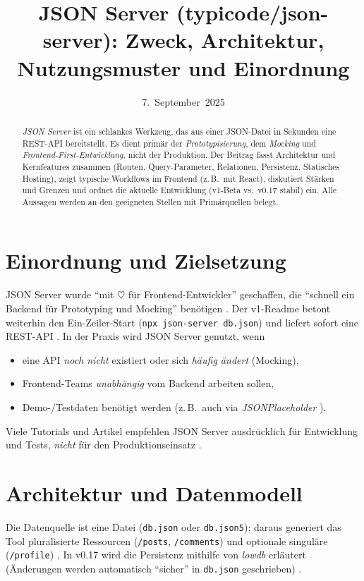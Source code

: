 \documentclass[11pt,a4paper]{article}
\title{JSON Server (typicode/json-server): Zweck, Architektur, Nutzungsmuster und Einordnung}
\author{ }
\date{7.~September~2025}
\begin{document}
\maketitle

\begin{abstract}
\noindent
\emph{JSON Server} ist ein schlankes Werkzeug, das aus einer JSON-Datei in Sekunden eine REST-API bereitstellt. Es dient primär der \emph{Prototypisierung}, dem \emph{Mocking} und \emph{Frontend-First-Entwicklung}, nicht der Produktion. Der Beitrag fasst Architektur und Kernfeatures zusammen (Routen, Query-Parameter, Relationen, Persistenz, Statisches Hosting), zeigt typische Workflows im Frontend (z.\,B.\ mit React), diskutiert Stärken und Grenzen und ordnet die aktuelle Entwicklung (v1-Beta vs.\ v0.17 stabil) ein. Alle Aussagen werden an den geeigneten Stellen mit Primärquellen belegt.
\end{abstract}

\section{Einordnung und Zielsetzung}
\label{sec:einordnung}
JSON Server wurde \enquote{mit $\heartsuit$ für Frontend-Entwickler} geschaffen, die \enquote{schnell ein Backend für Prototyping und Mocking} benötigen \cite[v0-Dokumentation]{jsonserver-github-v0}. Der v1-Readme betont weiterhin den Ein-Zeiler-Start (\texttt{npx json-server db.json}) und liefert sofort eine REST-API \cite[v1-Readme]{jsonserver-github-v1}. In der Praxis wird JSON Server genutzt, wenn
\begin{itemize}
  \item eine API \emph{noch nicht} existiert oder sich \emph{häufig ändert} (Mocking),
  \item Frontend-Teams \emph{unabhängig} vom Backend arbeiten sollen,
  \item Demo-/Testdaten benötigt werden (z.\,B.\ auch via \emph{JSONPlaceholder} \cite{jsonplaceholder}).
\end{itemize}
Viele Tutorials und Artikel empfehlen JSON Server ausdrücklich für Entwicklung und Tests, \emph{nicht} für den Produktionseinsatz \cite{freecodecamp,sitepoint}. 

\section{Architektur und Datenmodell}
\label{sec:architektur}
Die Datenquelle ist eine Datei (\texttt{db.json} oder \texttt{db.json5}); daraus generiert das Tool pluralisierte Ressourcen (\texttt{/posts}, \texttt{/comments}) und optionale singuläre (\texttt{/profile}) \cite[Abschnitt \enquote{Routes}]{jsonserver-github-v1}. In v0.17 wird die Persistenz mithilfe von \emph{lowdb} erläutert (Änderungen werden automatisch \enquote{sicher} in \texttt{db.json} geschrieben) \cite[v0-Persistenzhinweis]{jsonserver-github-v0}. 
\smallskip
\end{document}
